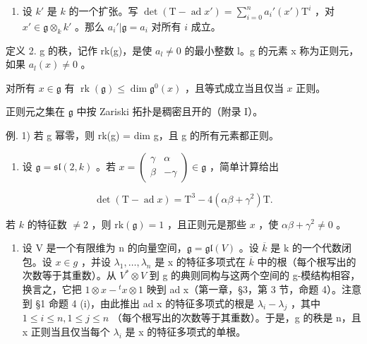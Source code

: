 \begin{enumerate}
\def\labelenumi{\arabic{enumi})}
\setcounter{enumi}{1}
\tightlist
\item
  设 \(k'\) 是 \(k\) 的一个扩张。写 \(\det(\mathrm{T} - \operatorname{ad} x') = \sum_{i=0}^{n} a_i'(x') \mathrm{T}^i\) ，对 \(x' \in \mathfrak{g} \otimes_k k'\) 。那么 \(a_i'| \mathfrak{g} = a_i\) 对所有 \(i\) 成立。
\end{enumerate}

定义 2. g 的秩，记作 rk(g)，是使 \(a_{l} \neq 0\) 的最小整数 l。g 的元素 x 称为正则元，如果 \(a_{l}(x) \neq 0\) 。

对所有 \(x \in \mathfrak{g}\) 有 \(\operatorname{rk}(\mathfrak{g}) \leq \dim \mathfrak{g}^0(x)\) ，且等式成立当且仅当 \(x\) 正则。

正则元之集在 \(\mathfrak{g}\) 中按 Zariski 拓扑是稠密且开的（附录 I）。

例. 1) 若 g 幂零，则 rk(g) = dim g，且 g 的所有元素都正则。

\begin{enumerate}
\def\labelenumi{\arabic{enumi})}
\setcounter{enumi}{1}
\tightlist
\item
  设 \(\mathfrak{g} = \mathfrak{sl}(2,k)\) 。若 \(x = \begin{pmatrix} \gamma & \alpha \\ \beta & -\gamma \end{pmatrix} \in \mathfrak{g}\) ，简单计算给出
\end{enumerate}

\[
\det (\mathrm{T} - \operatorname{ad} x) = \mathrm{T} ^ {3} - 4 (\alpha \beta + \gamma^ {2}) \mathrm{T}.
\]

若 \(k\) 的特征数 \(\neq 2\) ，则 \(\mathrm{rk}(\mathfrak{g}) = 1\) ，且正则元是那些 \(x\) ，使 \(\alpha \beta + \gamma^2 \neq 0\) 。

\begin{enumerate}
\def\labelenumi{\arabic{enumi})}
\setcounter{enumi}{2}
\tightlist
\item
  设 V 是一个有限维为 n 的向量空间，\(\mathfrak{g} = \mathfrak{gl}(V)\) 。设 \(\overline{k}\) 是 k 的一个代数闭包。设 \(x \in g\) ，并设 \(\lambda_{1}, \ldots, \lambda_{n}\) 是 x 的特征多项式在 \(\overline{k}\) 中的根（每个根写出的次数等于其重数）。从 \(V^{*} \otimes V\) 到 g 的典则同构与这两个空间的 g-模结构相容，换言之，它把 \(1 \otimes x - {}^{t}x \otimes 1\) 映到 ad x（第一章，§3，第 3 节，命题 4）。注意到 §1 命题 4 (i)，由此推出 ad x 的特征多项式的根是 \(\lambda_{i} - \lambda_{j}\) ，其中 \(1 \leq i \leq n, 1 \leq j \leq n\) （每个根写出的次数等于其重数）。于是，g 的秩是 n，且 x 正则当且仅当每个 \(\lambda_{i}\) 是 x 的特征多项式的单根。
\end{enumerate}

